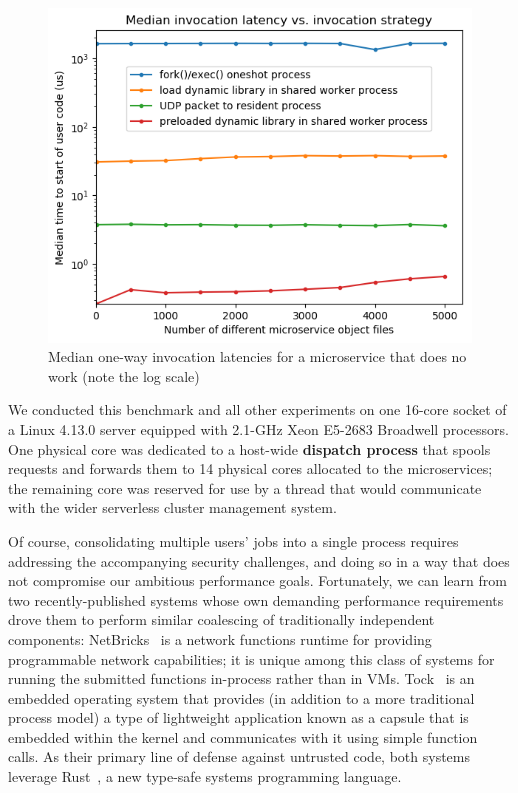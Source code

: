 \begin{figure}
\includegraphics[width=\columnwidth]{figs/2018-02-02-motivation_numfuns-latency-reordered}
\caption{Median one-way invocation latencies for a microservice that does no work (note the log scale)}
\label{fig:motive}
\end{figure}

We conducted this benchmark and all other experiments on one 16-core socket of a
Linux 4.13.0 server equipped with 2.1-GHz Xeon E5-2683 Broadwell processors.  One
physical core was dedicated to a host-wide \textbf{dispatch process} that spools
requests and forwards them to 14 physical cores allocated to the microservices; the
remaining core was reserved for use by a thread that would communicate with the wider
serverless cluster management system.

Of course, consolidating multiple users' jobs into a single process requires
addressing the accompanying security challenges, and doing so in a way that
does not compromise our ambitious performance goals.
Fortunately, we can learn from two recently-published systems whose own demanding
performance requirements drove them to perform similar coalescing of traditionally
independent components:  NetBricks~\cite{Panda2016} is a network functions runtime
for providing programmable network capabilities; it is unique among this class of
systems for running the submitted functions in-process rather than in VMs.
Tock~\cite{Levy2017} is an embedded operating system that provides (in addition to a
more traditional process model) a type of lightweight application known as a capsule
that is embedded within the kernel and communicates with it using simple function
calls.  As their primary line of defense against untrusted code, both systems
leverage Rust~\cite{www-rustlang}, a new type-safe systems programming language.

